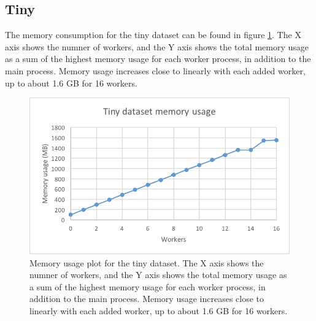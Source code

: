 \subsection{Tiny}
The memory consumption for the tiny dataset can be found in figure \ref{fig:dataset_1_memory}.
The X axis shows the numner of workers, and the Y axis shows the total memory usage as
a sum of the highest memory usage for each worker process, in addition to the main process. Memory usage increases close to linearly with each added worker,
up to about 1.6 GB for 16 workers.
\begin{figure}[ht]
  \centering
  \includegraphics[width=120mm]{figures/dataset_1/dataset_1_memory.png}
  \caption[Memory usage plot for the tiny dataset.]{Memory usage plot for the tiny dataset. The X axis shows the numner of workers, and the Y axis shows the total memory usage as
  a sum of the highest memory usage for each worker process, in addition to the main process. Memory usage increases close to linearly with each added worker,
  up to about 1.6 GB for 16 workers.}
  \label{fig:dataset_1_memory}
\end{figure}

